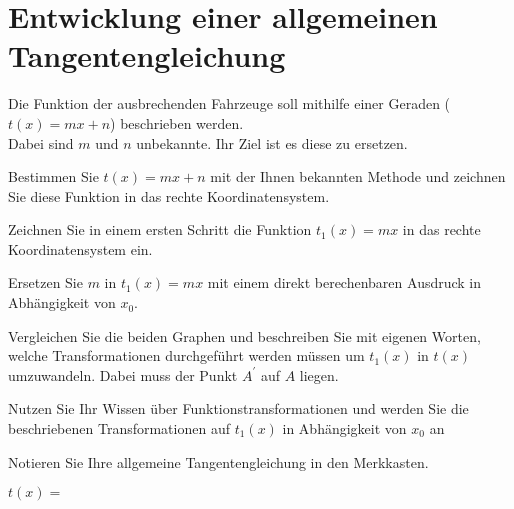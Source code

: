 	\section*{Entwicklung einer allgemeinen Tangentengleichung}
		\begin{enumerate}[a)]
	\begin{minipage}{0.6\textwidth}
		Die Funktion der ausbrechenden Fahrzeuge soll mithilfe einer Geraden ($t(x)=mx+n$) beschrieben werden.\\ Dabei sind $m$ und $n$ unbekannte. Ihr Ziel ist es diese zu ersetzen.
			\item Bestimmen Sie $t(x)=mx+n$ mit der Ihnen bekannten Methode und zeichnen Sie diese Funktion in das rechte Koordinatensystem.
			\item Zeichnen Sie in einem ersten Schritt die Funktion $t_1(x)=mx$ in das rechte Koordinatensystem ein.
			\item Ersetzen Sie $m$ in $t_1(x)=mx$ mit einem direkt berechenbaren Ausdruck in Abhängigkeit von $x_0$.
		
		
	\end{minipage}
	\begin{minipage}{0.4\textwidth}
		
		\begin{flushright}
			
		\end{flushright}
	\end{minipage}
	\item Vergleichen Sie die beiden Graphen und beschreiben Sie mit eigenen Worten, welche Transformationen durchgeführt werden müssen um $t_1(x)$ in $t(x)$ umzuwandeln. Dabei muss der Punkt $A^\prime$ auf $A$ liegen.
	\item Nutzen Sie Ihr Wissen über Funktionstransformationen und werden Sie die beschriebenen Transformationen auf $t_1(x)$ in Abhängigkeit von $x_0$ an
	\item Notieren Sie Ihre allgemeine Tangentengleichung in den Merkkasten.
\end{enumerate}
\begin{tcolorbox}[title=allgemeine Tangentengleichung]
	\LARGE{$t(x)=$}
\end{tcolorbox}


